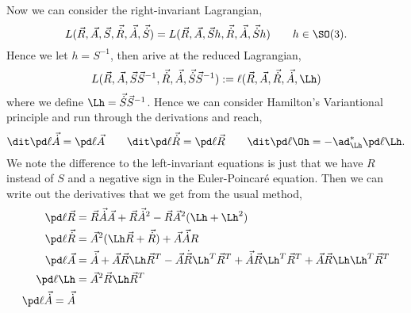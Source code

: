 Now we can consider the right-invariant Lagrangian,
$$ L(\vec R, \vec A, \vec S, \vec{\dot R}, \vec{\dot A}, \vec{\dot S}) = L(\vec R, \vec A, \vec Sh, \vec{\dot R}, \vec{\dot A}, \vec{\dot S}h) \qquad h \in \SO(3). $$
Hence we let $h = S^{-1}$, then arive at the reduced Lagrangian,
$$ L(\vec R, \vec A, \vec S\vec S^{-1}, \vec{\dot R}, \vec{\dot A}, \vec{\dot S}\vec S^{-1}) := \ell (\vec R,\vec A, \vec{\dot R}, \vec{\dot A}, \Lh) $$
where we define $\Lh = \vec{\dot S}\vec S^{-1}$. Hence we can consider Hamilton's Variantional principle and run through the derivations and reach,
$$ \dit \pd \ell {\vec{\dot A}} = \pd \ell {\vec A} \qquad \dit \pd \ell {\vec{\dot R}} = \pd \ell {\vec R} \qquad \dit \pd \ell \Oh = -\ad_{\Lh}^* \pd \ell \Lh. $$
We note the difference to the left-invariant equations is just that we have $R$ instead of $S$ and a negative sign in the Euler-Poincar\'e equation. Then we can write out the derivatives that we get from the usual method,
\begin{align*}
  \pd \ell {\vec R} &= \vec R\vec {\dot A}\vec A + \vec R\vec{\dot A}^2 - \vec R\vec A^2 (\Lh + \Lh^2)\\
  \pd \ell {\vec{\dot R}} &= \vec A^2(\Lh\vec R + \vec{\dot R}) + \vec A\vec{\dot A}R \\
  \pd \ell {\vec A} &= \vec{\dot A} + \vec A\vec R \Lh \vec R^T - \vec A\dot{\vec R}\Lh^T\vec R^T + \vec{\dot A}\vec R\Lh^T \vec{R}^T + \vec A\vec R \Lh\Lh^T \vec R^T\\
  \pd \ell \Lh &= \vec A^2 \vec R\Lh\vec R^T\\
  \pd \ell {\vec {\dot A}} = \vec{\dot A}
\end{align*}


